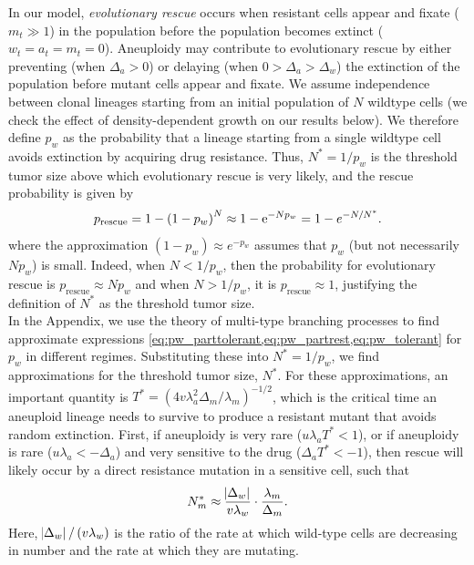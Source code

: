 \documentclass[12pt]{extarticle}
\newcommand{\e}{{\rm e}}
\newcommand{\presc}{p_\text{rescue}}
\begin{document}
In our model, \emph{evolutionary rescue} occurs when resistant cells appear and fixate ($m_t \gg 1$) in the population before the population becomes extinct ($w_t=a_t=m_t=0$).
Aneuploidy may contribute to evolutionary rescue by either preventing (when $\Delta_a>0$) or delaying (when $0>\Delta_a>\Delta_w$) the extinction of the population before mutant cells appear and fixate.
We assume independence between clonal lineages starting from an initial population of $N$ wildtype cells (we check the effect of density-dependent growth on our results below).
We therefore define $p_w$ as the probability that a lineage starting from a single wildtype cell avoids extinction by acquiring drug resistance.
Thus, $N^*=1/p_w$ is the threshold tumor size above which evolutionary rescue is very likely, and the rescue probability is given by 
\begin{equation} \label{eq:rescue_prob} 
\presc = 
1-\left(1-p_w\right)^N \approx
1-\e^{-Np_w} = 
1-e^{-N/N^*} .
\end{equation}
where the approximation $(1-p_w)\approx e^{-p_w}$ assumes that $p_w$ (but not necessarily $N p_w$) is small.
Indeed, when $N<1/p_w$, then the probability for evolutionary rescue is $\presc \approx N p_w$  and when $N > 1/p_w$, it is $\presc \approx 1$, justifying the definition of $N^*$ as the threshold tumor size. 
\\
In the Appendix, we use the theory of multi-type branching processes to find approximate expressions \cref{eq:pw_parttolerant,eq:pw_partrest,eq:pw_tolerant} for $p_w$ in different regimes. 
Substituting these  into $N^*=1/p_w$, we find approximations for the threshold tumor size, $N^*$. 
For these approximations, an important quantity is $T^* = (4 v \lambda_a^2 \Delta_m/\lambda_m)^{-1/2}$, which is the critical time an aneuploid lineage needs to survive to produce a resistant mutant that avoids random extinction.
First, if aneuploidy is very rare ($u\lambda_a T^*< 1$), or if aneuploidy is rare ($u\lambda_a < -\Delta_a$) and very sensitive to the drug ($\Delta_a T^* < -1$), then rescue will likely occur by a direct resistance mutation in a sensitive cell, such that 
\begin{equation} \label{eq:N_m}
N_m^* \approx \frac{\abs{\Delta_w}}{v\lambda_w} \cdot \frac{\lambda_m}{\Delta_m} .
\end{equation}
Here, $\abs{\Delta_w}/\left(v\lambda_w\right)$ is the ratio of the rate at which wild-type cells are decreasing in number and the rate at which they are mutating.
\end{document}
